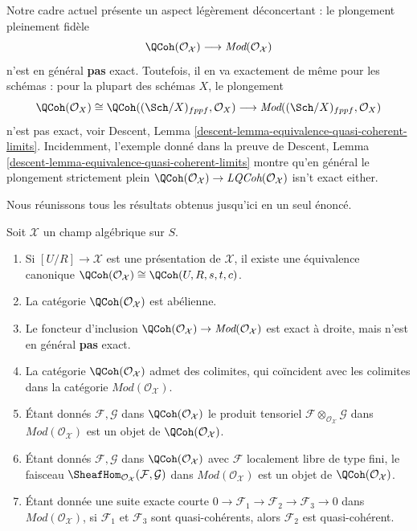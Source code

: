 \medskip\noindent
Notre cadre actuel présente un aspect légèrement déconcertant :
le plongement pleinement fidèle
$$
\QCoh(\mathcal{O}_\mathcal{X})
\longrightarrow
\textit{Mod}(\mathcal{O}_\mathcal{X})
$$
n'est en général {\bf pas} exact. Toutefois, il en va exactement de même
pour les schémas : pour la plupart des schémas $X$, le plongement
$$
\QCoh(\mathcal{O}_X) \cong
\QCoh((\Sch/X)_{fppf}, \mathcal{O}_X) \longrightarrow
\textit{Mod}((\Sch/X)_{fppf}, \mathcal{O}_X)
$$
n'est pas exact, voir
Descent, Lemma \ref{descent-lemma-equivalence-quasi-coherent-limits}.
Incidemment, l'exemple donné dans la preuve de
Descent, Lemma \ref{descent-lemma-equivalence-quasi-coherent-limits}
montre qu'en général le plongement strictement plein
$\QCoh(\mathcal{O}_\mathcal{X}) \to
\textit{LQCoh}(\mathcal{O}_\mathcal{X})$ isn't exact either.

\medskip\noindent
Nous réunissons tous les résultats obtenus jusqu'ici en un seul énoncé.

\begin{lemma}
\label{lemma-quasi-coherent-algebraic-stack}
Soit $\mathcal{X}$ un champ algébrique sur $S$.
\begin{enumerate}
\item Si $[U/R] \to \mathcal{X}$ est une présentation de $\mathcal{X}$,
il existe une équivalence canonique
$\QCoh(\mathcal{O}_\mathcal{X}) \cong
\QCoh(U, R, s, t, c)$.
\item La catégorie $\QCoh(\mathcal{O}_\mathcal{X})$ est abélienne.
\item Le foncteur d'inclusion $\QCoh(\mathcal{O}_\mathcal{X}) \to
\textit{Mod}(\mathcal{O}_\mathcal{X})$ est exact à droite, mais
n'est en général {\bf pas} exact.
\item La catégorie $\QCoh(\mathcal{O}_\mathcal{X})$
admet des colimites, qui coïncident avec les colimites dans la catégorie
$\textit{Mod}(\mathcal{O}_\mathcal{X})$.
\item Étant donnés $\mathcal{F}, \mathcal{G}$ dans
$\QCoh(\mathcal{O}_\mathcal{X})$
le produit tensoriel $\mathcal{F} \otimes_{\mathcal{O}_\mathcal{X}} \mathcal{G}$
dans $\textit{Mod}(\mathcal{O}_\mathcal{X})$
est un objet de $\QCoh(\mathcal{O}_\mathcal{X})$.
\item Étant donnés $\mathcal{F}, \mathcal{G}$ dans
$\QCoh(\mathcal{O}_\mathcal{X})$
avec $\mathcal{F}$ localement libre de type fini, le faisceau
$\SheafHom_{\mathcal{O}_\mathcal{X}}(\mathcal{F}, \mathcal{G})$
dans $\textit{Mod}(\mathcal{O}_\mathcal{X})$
est un objet de $\QCoh(\mathcal{O}_\mathcal{X})$.
\item Étant donnée une suite exacte courte
$0 \to \mathcal{F}_1 \to \mathcal{F}_2 \to \mathcal{F}_3 \to 0$
dans $\textit{Mod}(\mathcal{O}_\mathcal{X})$,
si $\mathcal{F}_1$ et $\mathcal{F}_3$ sont quasi-cohérents, alors
$\mathcal{F}_2$ est quasi-cohérent.
\end{enumerate}
\end{lemma}


